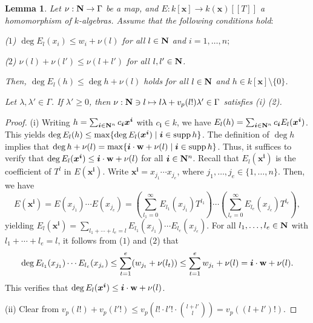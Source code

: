 \documentclass{amsart}
\theoremstyle{plain}
\newtheorem{lem}[thm]{Lemma}
\theoremstyle{definition}
\newcommand{\zs}{\{ 0\} }
\newcommand{\sm}{\setminus}
\newcommand{\nd}{\noindent}
\newcommand{\N}{{\bf N}}
\newcommand{\x}{{\boldsymbol x}}
\newcommand{\w}{{\bf w}}
\newcommand{\bi}{{\boldsymbol i}}
\newcommand{\kx}{k[\x]}
\newcommand{\kxr}{k(\x)}
\newcommand{\degw  }{\deg}
\newcommand{\supp }{\mathop{\rm supp}\nolimits}
\begin{document}
\begin{lem}\label{lem:E}
\nd{\rm (i)} 
Let $\nu :\N \to \Gamma $ be a map, 
and $E:\kx \to \kxr [[T]]$ a homomorphism of $k$-algebras. 
Assume that the following conditions hold$:$ 



{\rm ($1$)} 
$\degw E_l(x_i)\le w_i+\nu (l)$ for all 
$l\in \N $ and $i=1,\ldots ,n;$ 


{\rm ($2$)} 
$\nu (l)+\nu (l')\le \nu (l+l')$ for all $l,l'\in \N $. 


\nd 
Then, 
$\degw E_l(h)\le \degw h+\nu (l)$ 
holds for all $l\in \N $ and $h\in \kx \sm \zs $. 


\nd{\rm (ii)} 
Let $\lambda ,\lambda '\in \Gamma $. 
If $\lambda '\ge 0$, 
then 
$\nu :\N \ni l\mapsto l\lambda +v_p(l!)\lambda '\in \Gamma $ 
satisfies {\rm (i) (2)}. 
\end{lem}
\begin{proof}
(i) 
Writing 
$h=\sum _{{\boldsymbol i}\in \N ^n}c_{\boldsymbol i}\x ^{\boldsymbol i}$ 
with $c_{\boldsymbol i}\in k$, 
we have $E_l(h)
=\sum _{{\boldsymbol i}\in \N ^n}c_{\boldsymbol i}E_l(\x ^{\boldsymbol i})$. 
This yields 
$\deg E_l(h)\le \max \{ \deg E_l(\x ^{\bi })\mid \bi \in \supp h\} $. 
The definition of $\deg h$ implies that 
$\degw h+\nu (l)=\max \{ \bi \cdot \w +\nu (l)\mid \bi \in \supp h\} $. 
Thus, 
it suffices to verify that 
$\deg E_l(\x ^{\boldsymbol i})\le {\boldsymbol i}\cdot \w +\nu (l)$
for all ${\boldsymbol i}\in \N ^n$. 
Recall that $E_l(\x ^{\boldsymbol i})$ 
is the coefficient of $T^l$ in $E(\x ^{\boldsymbol i})$. 
Write $\x ^{\boldsymbol i}=x_{j_1}\cdots x_{j_e}$, where 
$j_1,\ldots ,j_e\in \{ 1,\ldots ,n\} $. 
Then, we have 
$$
E(\x ^{\boldsymbol i})=E(x_{j_1})\cdots E(x_{j_e})
=\left(\sum _{l_1=0}^{\infty }E_{l_1}(x_{j_1})T^{l_1}\right)
\cdots 
\left(\sum _{l_e=0}^{\infty }E_{l_e}(x_{j_e})T^{l_e}\right), 
$$
yielding $E_l(\x ^{\boldsymbol i})=\sum _{l_1+\cdots +l_e=l}
E_{l_1}(x_{j_1})\cdots E_{l_e}(x_{j_e})$. 
For all $l_1,\ldots ,l_e\in \N $ with $l_1+\cdots +l_e=l$, 
it follows from ($1$) and ($2$) that 
\begin{align*}
\degw E_{l_1}(x_{j_1})\cdots E_{l_e}(x_{j_e})
\le \sum _{t=1}^e(w_{j_t}+\nu (l_t)) 
\le \sum _{t=1}^ew_{j_t}+\nu (l)
={\boldsymbol i}\cdot \w +\nu (l). 
\end{align*}
This verifies that 
$\deg E_l(\x ^{\boldsymbol i})\le {\boldsymbol i}\cdot \w +\nu (l)$. 


(ii) 
Clear from 
$v_p(l!)+v_p(l'!)\le v_p(l!\cdot l'!\cdot \binom{l+l'}{l})=v_p((l+l')!)$. 
\end{proof}
\end{document}
